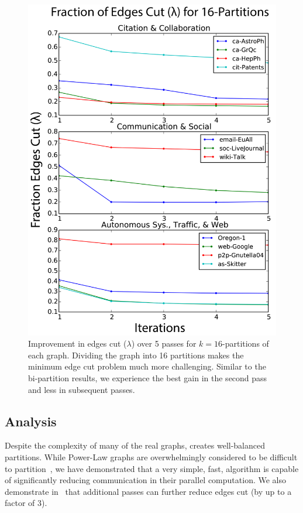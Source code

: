 \begin{figure}[t!]
\centering
\includegraphics[width=0.9\columnwidth] {figures/real_k16_lambda.pdf}
\caption[Caption for]{Improvement in edges cut ($\lambda$) over 5 passes for $k=16$-partitions of each graph. Dividing the graph into 16 partitions makes the minimum edge cut problem much more challenging. Similar to the bi-partition results, we experience the best gain in the second pass and less in subsequent passes.}
\label{fig:k16_lambda}
\end{figure}

\subsection{Analysis}
Despite the complexity of many of the real graphs, \ourmethod creates well-balanced partitions.
While Power-Law graphs are overwhelmingly considered to be difficult to partition~\cite{Abou-Rjeili:2006:MAP:1898953.1899055}, we have demonstrated that a very simple, fast, algorithm is capable of significantly reducing communication in their parallel computation. 
We also demonstrate in~ that additional passes can further reduce edges cut (by up to a factor of 3). 

